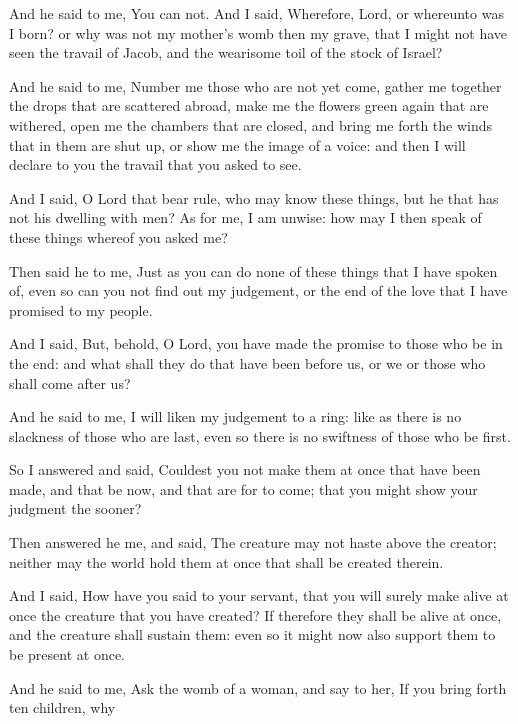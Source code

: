 {\par }{\PP {}And he said to me, You can not. And I said, Wherefore, Lord, or whereunto was I born? or why was not my mother’s womb then my grave, that I might not have seen the travail of Jacob, and the wearisome toil of the stock of Israel?
\par }{\PP {}And he said to me, Number me those who are not yet come, gather me together the drops that are scattered abroad, make me the flowers green again that are withered,
open me the chambers that are closed, and bring me forth the winds that in them are shut up, or show me the image of a voice: and then I will declare to you the travail that you asked to see.
\par }{\PP {}And I said, O Lord that bear rule, who may know these things, but he that has not his dwelling with men?
As for me, I am unwise: how may I then speak of these things whereof you asked me?
\par }{\PP {}Then said he to me, Just as you can do none of these things that I have spoken of, even so can you not find out my judgement, or the end of the love that I have promised to my people.
\par }{\PP {}And I said, But, behold, O Lord, you have made the promise to those who be in the end: and what shall they do that have been before us, or we
{} or those who shall come after us?
\par }{\PP {}And he said to me, I will liken my judgement to a ring: like as there is no slackness of those who are last, even so there is no swiftness of those who be first.
\par }{\PP {}So I answered and said, Couldest you not make them
{} at once that have been made, and that be now, and that are for to come; that you might show your judgment the sooner?
\par }{\PP {}Then answered he me, and said, The creature may not haste above the creator; neither may the world hold them at once that shall be created therein.
\par }{\PP {}And I said, How have you said to your servant, that
 you will surely make alive at once the creature that you have created?
 If therefore they shall be alive at once, and the creature shall sustain them: even so it might now also support them to be present at once.
\par }{\PP {}And he said to me, Ask the womb of a woman, and say to her, If you bring forth ten children, why
}
